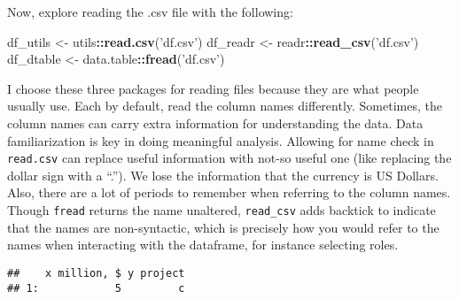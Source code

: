 \documentclass[]{book}
\newenvironment{Shaded}{\begin{snugshade}}{\end{snugshade}}
\newcommand{\DataTypeTok}[1]{\textcolor[rgb]{0.13,0.29,0.53}{#1}}
\newcommand{\DecValTok}[1]{\textcolor[rgb]{0.00,0.00,0.81}{#1}}
\newcommand{\KeywordTok}[1]{\textcolor[rgb]{0.13,0.29,0.53}{\textbf{#1}}}
\newcommand{\NormalTok}[1]{#1}
\newcommand{\OperatorTok}[1]{\textcolor[rgb]{0.81,0.36,0.00}{\textbf{#1}}}
\newcommand{\StringTok}[1]{\textcolor[rgb]{0.31,0.60,0.02}{#1}}
\begin{document}
Now, explore reading the .csv file with the following:

\begin{Shaded}
\begin{Highlighting}[]
\NormalTok{df_utils <-}\StringTok{ }\NormalTok{utils}\OperatorTok{::}\KeywordTok{read.csv}\NormalTok{(}\StringTok{'df.csv'}\NormalTok{)}
\NormalTok{df_readr <-}\StringTok{ }\NormalTok{readr}\OperatorTok{::}\KeywordTok{read_csv}\NormalTok{(}\StringTok{'df.csv'}\NormalTok{)}
\NormalTok{df_dtable <-}\StringTok{ }\NormalTok{data.table}\OperatorTok{::}\KeywordTok{fread}\NormalTok{(}\StringTok{'df.csv'}\NormalTok{)}
\end{Highlighting}
\end{Shaded}

I choose these three packages for reading files because they are what people usually use. Each by default, read the column names differently. Sometimes, the column names can carry extra information for understanding the data. Data familiarization is key in doing meaningful analysis. Allowing for name check in \texttt{read.csv} can replace useful information with not-so useful one (like replacing the dollar sign with a ``.''). We lose the information that the currency is US Dollars. Also, there are a lot of periods to remember when referring to the column names. Though \texttt{fread} returns the name unaltered, \texttt{read\_csv} adds backtick to indicate that the names are non-syntactic, which is precisely how you would refer to the names when interacting with the dataframe, for instance selecting roles.

\begin{Shaded}
\end{Shaded}

\begin{verbatim}
##    x million, $ y project
## 1:            5         c
\end{verbatim}

\begin{Shaded}
\end{Shaded}
\end{document}
